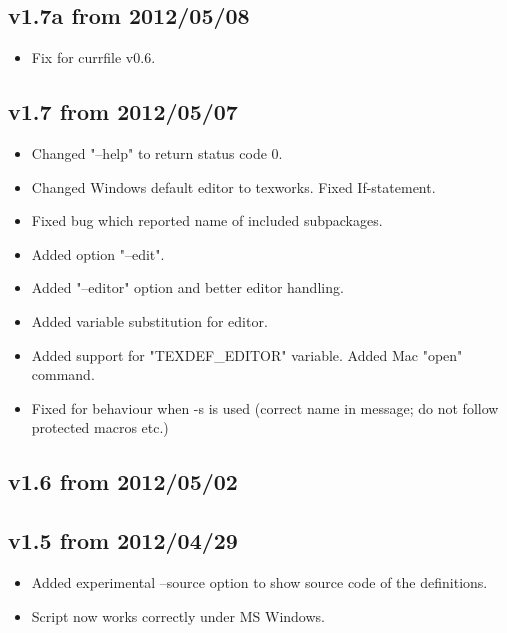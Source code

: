 \documentclass{article}
\begin{document}
\subsection*{v1.7a from 2012/05/08}
\begin{itemize}
 \item Fix for currfile v0.6.
\end{itemize}

\subsection*{v1.7 from 2012/05/07}
\begin{itemize}
 \item Changed "--help" to return status code 0.
 \item Changed Windows default editor to texworks. Fixed If-statement.
 \item Fixed bug which reported name of included subpackages.
 \item Added option "--edit".
 \item Added "--editor" option and better editor handling.
 \item Added variable substitution for editor.
 \item Added support for "TEXDEF\_EDITOR" variable. Added Mac "open" command.
 \item Fixed for behaviour when -s is used (correct name in message; do not follow protected macros etc.)
\end{itemize}

\subsection*{v1.6 from 2012/05/02}

\subsection*{v1.5 from 2012/04/29}
\begin{itemize}
 \item Added experimental --source option to show source code of the definitions.
 \item Script now works correctly under MS Windows.
\end{itemize}
\end{document}
